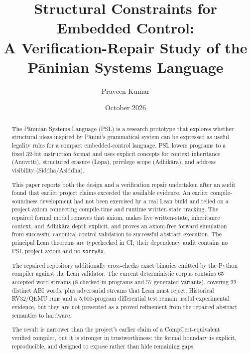\documentclass[11pt,a4paper]{article}
\begin{document}
\title{Structural Constraints for Embedded Control:\\
       A Verification-Repair Study of the P\={a}ninian Systems Language}

\author[1]{Praveen Kumar}
\date{October 2026}

\maketitle

\begin{abstract}
The P\={a}ninian Systems Language (PSL) is a research prototype that explores
whether structural ideas inspired by P\={a}nini's grammatical system can be
expressed as useful legality rules for a compact embedded-control language.
PSL lowers programs to a fixed 32-bit instruction format and uses explicit
concepts for context inheritance (Anuvrtti), structured erasure (Lopa),
privilege scope (Adhik\={a}ra), and address visibility (Siddha/Asiddha).

This paper reports both the design and a verification repair undertaken after
an audit found that earlier project claims exceeded the available evidence.
An earlier compile-soundness development had not been exercised by a real
Lean build and relied on a project axiom connecting compile-time and runtime
written-state tracking. The repaired formal model removes that axiom, makes
live written-state, inheritance context, and Adhik\={a}ra depth explicit,
and proves an axiom-free forward simulation from successful canonical control
validation to successful abstract execution. The principal Lean theorems are
typechecked in CI; their dependency audit contains no PSL project axiom and no
\texttt{sorryAx}.

The repaired repository additionally cross-checks exact binaries emitted by the
Python compiler against the Lean validator. The current deterministic corpus
contains 65 accepted word streams (8 checked-in programs and 57 generated
variants), covering 22 distinct ABI words, plus adversarial streams that Lean
must reject. Historical RV32/QEMU runs and a 5,000-program differential test
remain useful experimental evidence, but they are not presented as a proved
refinement from the repaired abstract semantics to hardware.

The result is narrower than the project's earlier claim of a
CompCert-equivalent verified compiler, but it is stronger in trustworthiness:
the formal boundary is explicit, reproducible, and designed to expose rather
than hide remaining gaps.
\end{abstract}
\end{document}
